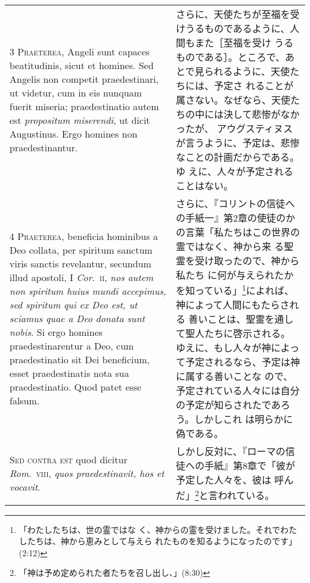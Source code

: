 \documentclass[10pt]{jsarticle} %
\begin{document}
\begin{longtable}{p{21em}p{21em}}
\\


{\scshape 3 Praeterea}, Angeli sunt capaces
beatitudinis, sicut et homines. Sed Angelis non competit praedestinari,
ut videtur, cum in eis nunquam fuerit miseria; praedestinatio autem est
{\itshape propositum miserendi}, ut dicit Augustinus. Ergo homines non
praedestinantur.


 
&

さらに、天使たちが至福を受けうるものであるように、人間もまた［至福を受け
 うるものである］。ところで、あとで見られるように、天使たちには、予定さ
 れることが属さない。なぜなら、天使たちの中には決して悲惨がなかったが、
 アウグスティヌスが言うように、予定は、悲惨なことの計画だからである。ゆ
 えに、人々が予定されることはない。

 
\\


{\scshape 4 Praeterea}, beneficia hominibus a Deo
collata, per spiritum sanctum viris sanctis revelantur, secundum illud
apostoli, I {\itshape Cor}.~{\scshape ii}, {\itshape nos autem non spiritum huius mundi accepimus, sed
spiritum qui ex Deo est, ut sciamus quae a Deo donata sunt nobis}. Si
ergo homines praedestinarentur a Deo, cum praedestinatio sit Dei
beneficium, esset praedestinatis nota sua praedestinatio. Quod patet
esse falsum.


 
&

さらに、『コリントの信徒への手紙一』第2章の使徒のかの言葉「私たちはこの世界の霊ではなく、神から来
 る聖霊を受け取ったので、神から私たち
 に何が与えられたかを知っている」\footnote{「わたしたちは、世の霊ではな
 く、神からの霊を受けました。それでわたしたちは、神から恵みとして与えら
 れたものを知るようになったのです」(2:12)}によれば、神によって人間にもたらされる
 善いことは、聖霊を通して聖人たちに啓示される。
 ゆえに、もし人々が神によって予定されるなら、予定は神に属する善いことな
 ので、予定されている人々には自分の予定が知らされたであろう。しかしこれ
 は明らかに偽である。
 

\\


{\scshape Sed contra est} quod dicitur {\itshape Rom}.~{\scshape viii}, {\itshape quos
praedestinavit, hos et vocavit}.


 
&

しかし反対に、『ローマの信徒への手紙』第8章で「彼が予定した人々を、彼は
 呼んだ」\footnote{「神は予め定められた者たちを召し出し、」(8:30)}と言われている。
 


\end{longtable}
\end{document}
